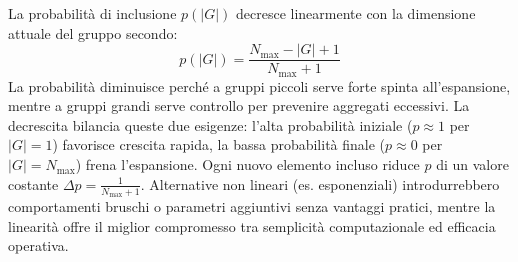 La probabilità di inclusione \(p(|G|)\) decresce linearmente con la dimensione attuale del gruppo secondo:
\[
p(|G|) = \frac{N_{\text{max}} - |G| + 1}{N_{\text{max}} + 1}
\]
La probabilità diminuisce perché a gruppi piccoli serve forte spinta all'espansione, mentre a gruppi grandi serve controllo per prevenire aggregati eccessivi. La decrescita bilancia queste due esigenze: l'alta probabilità iniziale (\(p \approx 1\) per \(|G|=1\)) favorisce crescita rapida, la bassa probabilità finale (\(p \approx 0\) per \(|G|=N_{\max}\)) frena l'espansione.
Ogni nuovo elemento incluso riduce \(p\) di un valore costante \(\Delta p = \frac{1}{N_{\max}+1}\). Alternative non lineari (es. esponenziali) introdurrebbero comportamenti bruschi o parametri aggiuntivi senza vantaggi pratici, mentre la linearità offre il miglior compromesso tra semplicità computazionale ed efficacia operativa.
